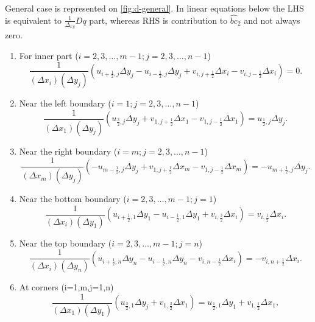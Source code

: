 \documentclass{article}
\numberwithin{equation}{section}
\begin{document}
General case is represented on \cref{fig:d-general}. In linear equations below the LHS is equivalent to $\frac{1}{\Delta_{xy}} D q$ part, whereas RHS is contribution to $\hat{bc}_2$ and not always zero.
\begin{enumerate}
	\item For inner part ($i=2,3,\dots ,m-1;j=2,3,\dots ,n-1$)
		\begin{equation}
			\frac{1}{\left(\Delta{x_i}\right)\left(\Delta{y_j}\right)} \left(u_{i+\frac{1}{2},j}\Delta y_j - u_{i-\frac{1}{2},j}\Delta y_j+v_{i,j+\frac{1}{2}}\Delta x_i - v_{i,j-\frac{1}{2}}\Delta x_i\right)=0.
		\end{equation}
	\item Near the left boundary ($i=1;j=2,3,\dots ,n-1$)
		\begin{equation}
			\frac{1}{\left(\Delta{x_1}\right)\left(\Delta{y_j}\right)} \left(u_{\frac{3}{2},j}\Delta y_j +v_{1,j+\frac{1}{2}}\Delta x_1 - v_{1,j-\frac{1}{2}}\Delta x_1\right)=u_{\frac{1}{2},j}\Delta y_j.
		\end{equation}
	\item Near the right boundary ($i=m;j=2,3,\dots ,n-1$)
		\begin{equation}
			\frac{1}{\left(\Delta{x_m}\right)\left(\Delta{y_j}\right)} \left(-u_{m-\frac{1}{2},j}\Delta y_j +v_{1,j+\frac{1}{2}}\Delta x_m - v_{1,j-\frac{1}{2}}\Delta x_m\right)=-u_{m+\frac{1}{2},j}\Delta y_j.
		\end{equation}
	\item Near the bottom boundary ($i=2,3,\dots ,m-1;j=1$)
		\begin{equation}
			\frac{1}{\left(\Delta{x_i}\right)\left(\Delta{y_1}\right)} \left(u_{i+\frac{1}{2},1}\Delta y_1 - u_{i-\frac{1}{2},1}\Delta y_1+v_{i,\frac{3}{2}}\Delta x_i\right)=v_{i,\frac{1}{2}}\Delta x_i.
		\end{equation}
	\item Near the top boundary ($i=2,3,\dots ,m-1;j=n$)
		\begin{equation}
			\frac{1}{\left(\Delta{x_i}\right)\left(\Delta{y_n}\right)} \left(u_{i+\frac{1}{2},n}\Delta y_n - u_{i-\frac{1}{2},n}\Delta y_n - v_{i,n-\frac{1}{2}}\Delta x_i\right)=-v_{i,n+\frac{1}{2}}\Delta x_i.
		\end{equation}
	\item At corners (i=1,m,j=1,n)
		\begin{equation}
			\frac{1}{\left(\Delta{x_1}\right)\left(\Delta{y_1}\right)} \left(u_{\frac{3}{2},1}\Delta y_j +v_{1,\frac{3}{2}}\Delta x_1 \right)=u_{\frac{1}{2},1}\Delta y_1+v_{1,\frac{1}{2}}\Delta x_1,

\end{equation}
\end{enumerate}
\end{document}
